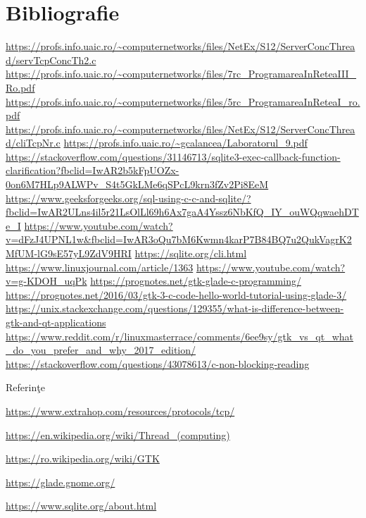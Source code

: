 \documentclass[11pt,leqno, runningheads]{llncs}
\begin{document}
\section{Bibliografie}

\begin{thebibliography}{100}
\bibitem{}\url{https://profs.info.uaic.ro/~computernetworks/files/NetEx/S12/ServerConcThread/servTcpConcTh2.c}
\bibitem{}\url{https://profs.info.uaic.ro/~computernetworks/files/7rc_ProgramareaInReteaIII_Ro.pdf}
\bibitem{}\url{https://profs.info.uaic.ro/~computernetworks/files/5rc_ProgramareaInReteaI_ro.pdf}
\bibitem{}\url{https://profs.info.uaic.ro/~computernetworks/files/NetEx/S12/ServerConcThread/cliTcpNr.c}
\bibitem{}\url{https://profs.info.uaic.ro/~gcalancea/Laboratorul_9.pdf}
\bibitem{}\url{https://stackoverflow.com/questions/31146713/sqlite3-exec-callback-function-clarification?fbclid=IwAR2b5kFpUOZx-0on6M7HLp9ALWPv_S4t5GkLMe6qSPcL9krn3fZv2Pi8EeM}
\bibitem{}\url{https://www.geeksforgeeks.org/sql-using-c-c-and-sqlite/?fbclid=IwAR2ULns4il5r21LsOlLl69h6Ax7gaA4Yssz6NbKfQ_IY_ouWQqwaehDTe_I}
\bibitem{}\url{https://www.youtube.com/watch?v=dFzJ4UPNL1w&fbclid=IwAR3oQu7bM6Kwmn4karP7B84BQ7u2QukVagrK2MfUM-lG9sE57yL9ZdV9HRI}
\bibitem{}\url{https://sqlite.org/cli.html}
\bibitem{}\url{https://www.linuxjournal.com/article/1363}
\bibitem{}\url{https://www.youtube.com/watch?v=g-KDOH_uqPk}
\bibitem{}\url{https://prognotes.net/gtk-glade-c-programming/}
\bibitem{}\url{https://prognotes.net/2016/03/gtk-3-c-code-hello-world-tutorial-using-glade-3/}
\bibitem{}\url{https://unix.stackexchange.com/questions/129355/what-is-difference-between-gtk-and-qt-applications}
\bibitem{}\url{https://www.reddit.com/r/linuxmasterrace/comments/6ee9sy/gtk_vs_qt_what_do_you_prefer_and_why_2017_edition/}
\bibitem{}\url{https://stackoverflow.com/questions/43078613/c-non-blocking-reading}



Referin\c te



\cite{1}\url{https://www.extrahop.com/resources/protocols/tcp/}


\cite{2}\url{https://en.wikipedia.org/wiki/Thread_(computing)}

\cite{3}\url{https://ro.wikipedia.org/wiki/GTK}


\cite{4}\url{https://glade.gnome.org/}


\cite{5}\url{https://www.sqlite.org/about.html}
\end{thebibliography}
\end{document}
